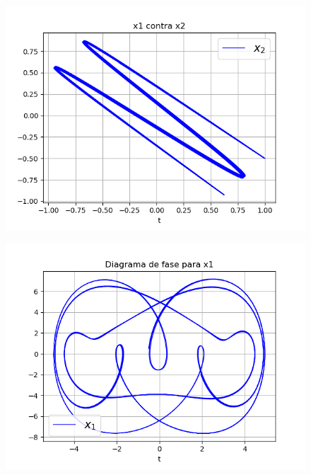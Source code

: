 \documentclass{article}
\begin{document}
\begin{figure}[H]
\centering
\includegraphics[scale=0.59]{31_v.png}
\end{figure}

\begin{figure}[H]
\centering
\includegraphics[scale=0.59]{32_f1.png}
\end{figure}
\end{document}
